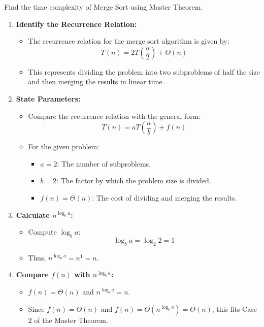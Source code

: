     \begin{example}
        Find the time complexity of Merge Sort using Master Theorem.
        \begin{enumerate}
            \item \textbf{Identify the Recurrence Relation:}
            \begin{itemize}
                \item The recurrence relation for the merge sort algorithm is given by:
                \[
                T(n) = 2T\left(\frac{n}{2}\right) + \Theta(n)
                \]
                \item This represents dividing the problem into two subproblems of half the size and then merging the results in linear time.
            \end{itemize}
        
            \item \textbf{State Parameters:}
            \begin{itemize}
                \item Compare the recurrence relation with the general form:
                \[
                T(n) = aT\left(\frac{n}{b}\right) + f(n)
                \]
                \item For the given problem:
                \begin{itemize}
                    \item \( a = 2 \): The number of subproblems.
                    \item \( b = 2 \): The factor by which the problem size is divided.
                    \item \( f(n) = \Theta(n) \): The cost of dividing and merging the results.
                \end{itemize}
            \end{itemize}
        
            \item \textbf{Calculate \( n^{\log_b a} \):}
            \begin{itemize}
                \item Compute \( \log_b a \):
                \[
                \log_b a = \log_2 2 = 1
                \]
                \item Thus, \( n^{\log_b a} = n^1 = n \).
            \end{itemize}
        
            \item \textbf{Compare \( f(n) \) with \( n^{\log_b a} \):}
            \begin{itemize}
                \item \( f(n) = \Theta(n) \) and \( n^{\log_b a} = n \).
                \item Since \( f(n) = \Theta(n) \) and \( f(n) = \Theta(n^{\log_b a}) = \Theta(n) \), this fits Case 2 of the Master Theorem.
            \end{itemize}
        

\end{enumerate}
\end{example}
